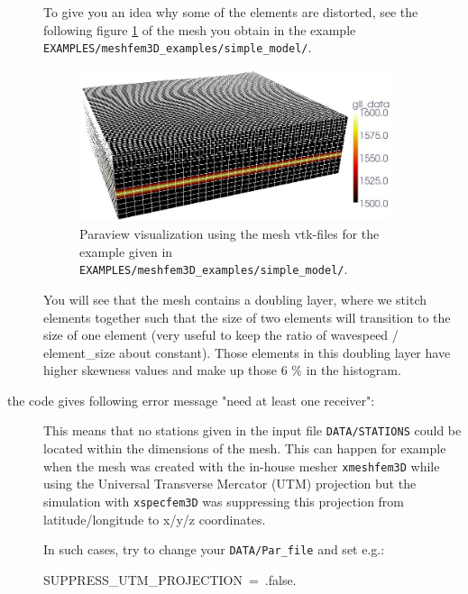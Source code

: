 \begin{description}
To give you an idea why some of the elements are distorted, see the
following figure \ref{fig:mesh.vp} of the mesh you obtain in the
example \texttt{EXAMPLES/meshfem3D\_examples/simple\_model/}.
\begin{figure}[htbp]
\noindent \begin{centering}
\includegraphics[width=0.9\textwidth]{figures/mesh_vp.jpg}
\par\end{centering}

\caption{Paraview visualization using the mesh vtk-files for the example given
in \texttt{EXAMPLES/meshfem3D\_examples/simple\_model/}.}


\label{fig:mesh.vp}
\end{figure}



You will see that the mesh contains a doubling layer, where we stitch
elements together such that the size of two elements will transition
to the size of one element (very useful to keep the ratio of wavespeed
/ element\_size about constant). Those elements in this doubling layer
have higher skewness values and make up those 6 \% in the histogram.

\item [{the code gives following error message "need at least one receiver":}] This
means that no stations given in the input file \texttt{DATA/STATIONS}
could be located within the dimensions of the mesh. This can happen
for example when the mesh was created with the in-house mesher \texttt{xmeshfem3D}
while using the Universal Transverse Mercator (UTM) projection but
the simulation with \texttt{xspecfem3D} was suppressing this projection
from latitude/longitude to x/y/z coordinates.


In such cases, try to change your \texttt{DATA/Par\_file} and set
e.g.:
\begin{lyxcode}
SUPPRESS\_UTM\_PROJECTION~=~.false.~~~\\


\end{lyxcode}
\end{description}
